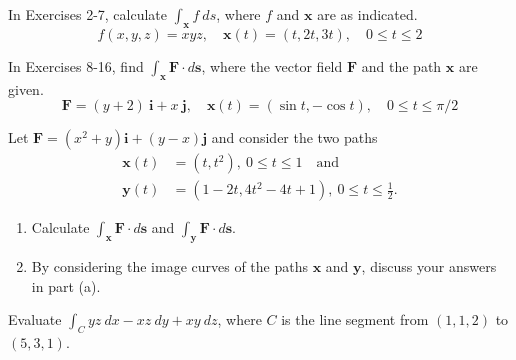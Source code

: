 \documentclass[12pt,letterpaper]{hmcpset}
\newcommand{\f}[2]{\frac{#1}{#2}}
\renewcommand{\bf}[1]{\mathbf{#1}}
\begin{document}

\begin{problem}[Colley 6.1.2]
    In Exercises 2-7, calculate $\int_{\bf{x}}f~ds$, where $f$ and
    $\bf{x}$ are as indicated.
    \[
        f(x,y,z)=xyz,\quad\bf{x}(t)=(t,2t,3t),\quad0\leq t\leq2
    \]
\end{problem}
\begin{solution}
    \vfill
\end{solution}
\newpage

\begin{problem}[Colley 6.1.9]
    In Exercises 8-16, find $\int_{\bf{x}}\bf{F}\cdot d\bf{s}$, where the
    vector field $\bf{F}$ and the path $\bf{x}$ are given.
    \[
        \bf{F}=(y+2)~\bf{i}+x~\bf{j},\quad\bf{x}(t)=(\sin t,-\cos t),
        \quad0\leq t\leq\pi/2
    \]
\end{problem}
\begin{solution}
    \vfill
\end{solution}
\newpage

\begin{problem}[Colley 6.1.21]
    Let $\bf{F}=(x^2+y)\bf{i}+(y-x)\bf{j}$ and consider the two paths
    \begin{align*}
        \bf{x}(t)&=(t,t^2),~0\leq t\leq1\quad\text{and}\\
        \bf{y}(t)&=(1-2t,4t^2-4t+1),~0\leq t\leq\f{1}{2}.
    \end{align*}
    \begin{enumerate}
        \item Calculate $\int_{\bf{x}}\bf{F}\cdot d\bf{s}$ and
            $\int_{\bf{y}}\bf{F}\cdot d\bf{s}$.
        \item By considering the image curves of the paths $\bf{x}$
            and $\bf{y}$, discuss your answers in part (a).
    \end{enumerate}
\end{problem}
\begin{solution}
    \vfill
\end{solution}
\newpage

\begin{problem}[Colley 6.1.31]
    Evaluate $\int_Cyz~dx-xz~dy+xy~dz$, where $C$ is the line segment
    from $(1,1,2)$ to $(5,3,1)$.
\end{problem}
\begin{solution}
    \vfill
\end{solution}
\newpage
\end{document}
